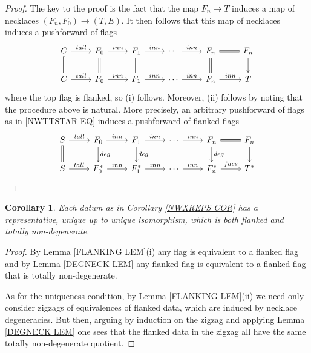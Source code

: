 \documentclass[a4paper,10pt
,draft
]{article}%
\numberwithin{equation}{section}
\numberwithin{figure}{section}
\newtheorem{corollary}[equation]{Corollary}%
\theoremstyle{definition} %
\newcommand{\1}{\ensuremath{\mathbbm 1}}%
\begin{document}
\begin{proof}
	The key to the proof is the fact that 
	the map $F_n \to T$
	induces a map of necklaces
	$(F_n,F_0) \to (T,E)$.
	It then follows that this map of necklaces induces a pushforward of flags
\begin{equation}
\begin{tikzcd}
	C \ar{r}{tall} \ar[equal]{d}
&
	F_0 \ar{r}{inn} \ar[equal]{d}
&
	F_1 \ar{r}{inn} \ar[equal]{d}
&
	\cdots
	\ar{r}{inn}
&
	F_n \ar[equal]{r} \ar[equal]{d}
&
	F_n \ar{d}
\\
	C \ar{r}{tall}
&
	F_0 \ar{r}{inn}
&
	F_1 \ar{r}{inn}
&
	\cdots
	\ar{r}{inn}
&
	F_n \ar{r}{inn}
&
	T
\end{tikzcd}
\end{equation}	
where the top flag is flanked, so (i) follows.
Moreover, (ii) follows by noting that the procedure above is natural.
More precisely, 
an arbitrary pushforward of flags as in 
\eqref{NWTTSTAR EQ}
induces a pushforward of flanked flags
\begin{equation}
\begin{tikzcd}
	S \ar{r}{tall} \ar[equal]{d}
&
	F_0 \ar{r}{inn} \ar{d}{deg}
&
	F_1 \ar{r}{inn} \ar{d}{deg}
&
	\cdots \ar{r}{inn}
&
	F_n \ar[equal]{r} \ar{d}{deg}
&
	F_n \ar{d}
\\
	S \ar{r}{tall} 
&
	F^{\**}_0 \ar{r}{inn}
&
	F^{\**}_1 \ar{r}{inn}
&
	\cdots \ar{r}{inn}
&
	F^{\**}_n \ar{r}{face}
&
	T^{\**}
\end{tikzcd}
\end{equation}
\end{proof}



\begin{corollary}
	Each datum as in Corollary \ref{NWXREPS COR}
	has a representative, unique up to unique isomorphism,
	which is both flanked and totally non-degenerate.
\end{corollary}



\begin{proof}
	By Lemma \ref{FLANKING LEM}(i)
	any flag is equivalent to a flanked flag
	and by Lemma \ref{DEGNECK LEM}
	any flanked flag is equivalent to a flanked flag that is
	totally non-degenerate.
	
	As for the uniqueness condition, 
	by Lemma \ref{FLANKING LEM}(ii)
	we need only consider zigzags of 
	equivalences of flanked data, 
	which are induced by necklace degeneracies.
	But then, arguing by induction on the zigzag
	and applying 
	Lemma \ref{DEGNECK LEM}
	one sees that the flanked data in the zigzag all have the same
	totally non-degenerate quotient.
\end{proof}
\end{document}
